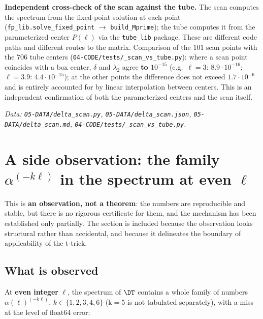 \textbf{Independent cross-check of the scan against the tube.} The scan computes
the spectrum from the fixed-point solution at each point
(\texttt{fp\_\allowbreak lib.solve\_\allowbreak fixed\_\allowbreak point} $\to$ \texttt{build\_Mprime}); the tube computes it from the
parameterized center $P(\ell)$ via the \texttt{tube\_lib} package. These are different
code paths and different routes to the matrix. Comparison of the $101$ scan
points with the $706$ tube centers (\texttt{04-\allowbreak CODE/\allowbreak tests/\allowbreak \_\allowbreak scan\_\allowbreak vs\_\allowbreak tube.py}): where a
scan point coincides with a box center, $\delta$ and $\lambda_{2}$ agree \textbf{to $10^{-15}$}
(e.g.\ $\ell=3$: $8.9\cdot 10^{-16}$; $\ell=3.9$: $4.4\cdot 10^{-15}$); at the other points the difference
does not exceed $1.7\cdot 10^{-6}$ and is entirely accounted for by linear
interpolation between centers. This is an independent confirmation of both
the parameterized centers and the scan itself.

\emph{Data: \texttt{05-\allowbreak DATA/\allowbreak delta\_\allowbreak scan.py}, \texttt{05-\allowbreak DATA/\allowbreak delta\_\allowbreak scan.json},
\texttt{05-\allowbreak DATA/\allowbreak delta\_\allowbreak scan.md}, \texttt{04-\allowbreak CODE/\allowbreak tests/\allowbreak \_\allowbreak scan\_\allowbreak vs\_\allowbreak tube.py}.}


\section{A side observation: the family $\alpha^{(-k\ell)}$ in the spectrum at even $\ell$}
\label{sec:8}

This is \textbf{an observation, not a theorem}: the numbers are reproducible and
stable, but there is no rigorous certificate for them, and the mechanism has
been established only partially. The section is included because the
observation looks structural rather than accidental, and because it
delineates the boundary of applicability of the t-trick.


\subsection{What is observed}
\label{sec:8.1}

At \textbf{even integer} $\ell$, the spectrum of $\DT$ contains a whole family of
numbers $\alpha(\ell)^{(-k\ell)}$, $k \in \{1,2,3,4,6\}$ (k$=$5 is not tabulated separately),
with a miss at the level of float64 error:

